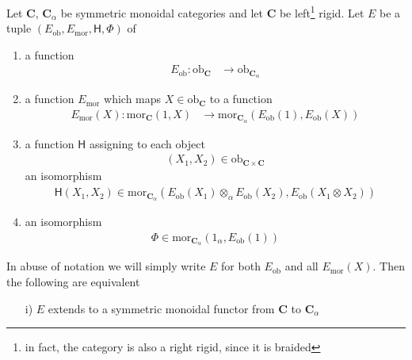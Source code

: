 \begin{thm}
\label{thm:appacsmf}
Let $\mathbf{C}$, $\mathbf{C}_{\alpha}$ be symmetric monoidal categories and let $\mathbf{C}$ be left\footnote{
in fact, the category is also a right rigid, since it is braided} rigid. Let $E$ be a tuple $(E_{\mathrm{ob}},E_{\mathrm{mor}},\mathsf{H},\Phi)$ of
\begin{enumerate}
\item
a function
\begin{align*}
  E_{\mathrm{ob}}
  \colon
  \mathrm{ob}_{\mathbf{C}}
  &\to
  \mathrm{ob}_{\mathbf{C}_{\alpha}}
\end{align*}

\item
a function $E_{\mathrm{mor}}$ which maps $X \in \mathrm{ob}_{\mathbf{C}}$ to a function
\begin{align*}
  E_{\mathrm{mor}}(X)
  \colon
  \mathrm{mor}_{\mathbf{C}}(1,X)
  &\to
  \mathrm{mor}_{\mathbf{C}_{\alpha}}
  \left(
    E_{\mathrm{ob}}(1)
    ,
    E_{\mathrm{ob}}(X)
  \right)
\end{align*}

\item
a function $\mathsf{H}$ assigning to each object
\begin{align*}
  (X_{1},X_{2})
  \in
  \mathrm{ob}_{\mathbf{C} \times \mathbf{C}}
\end{align*}
an isomorphism
\begin{align*}
  \mathsf{H}(X_{1},X_{2})
  \in
  \mathrm{mor}_{\mathbf{C}_{\alpha}}
  \left(
    E_{\mathrm{ob}}(X_{1})
    \otimes_{\alpha}
    E_{\mathrm{ob}}(X_{2})
    ,
    E_{\mathrm{ob}}(X_{1} \otimes X_{2})
  \right)
\end{align*}

\item
an isomorphism
\begin{align*}
  \Phi
  \in
  \mathrm{mor}_{\mathbf{C}_{\alpha}}
  \left(
    1_{\alpha}
    ,
    E_{\mathrm{ob}}(1)
  \right)
\end{align*}
\end{enumerate}
In abuse of notation we will simply write $E$ for both $E_{\mathrm{ob}}$ and all $E_{\mathrm{mor}}(X)$. Then the following are equivalent
\begin{enumerate}
\item[i)]
$E$ extends to a symmetric monoidal functor from $\mathbf{C}$ to $\mathbf{C}_{\alpha}$


\end{enumerate}
\end{thm}
